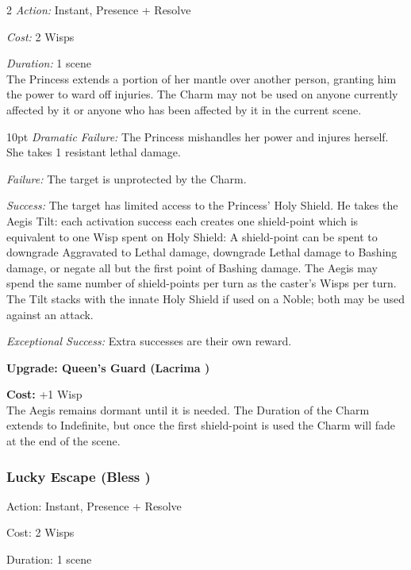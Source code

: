 \begin{multicols}{2}
\emph{Action:} Instant, Presence + Resolve

\emph{Cost:} 2 Wisps

\emph{Duration:} 1 scene \\

\noindent The Princess extends a portion of her mantle over another person, granting him the power to ward off injuries. The Charm may not be used on anyone currently affected by it or anyone who has been affected by it in the current scene. 

\begin{myindentpar}{10pt}    \emph{Dramatic Failure:} The Princess mishandles her power and injures herself. She takes 1 resistant lethal damage.

\emph{Failure:} The target is unprotected by the Charm. 

\emph{Success:} The target has limited access to the Princess’ Holy Shield. He takes the Aegis Tilt: each activation success each creates one shield-point which is equivalent to one Wisp spent on Holy Shield: A shield-point can be spent to downgrade Aggravated to Lethal damage, downgrade Lethal damage to Bashing damage, or negate all but the first point of Bashing damage. The Aegis may spend the same number of shield-points per turn as the caster's Wisps per turn. The Tilt stacks with the innate Holy Shield if used on a Noble; both may be used against an attack. 

\emph{Exceptional Success:} Extra successes are their own reward.

\textbf{Upgrade: Queen's Guard (Lacrima \textbullet\textbullet\textbullet)}

\noindent \textbf{Cost:} +1 Wisp\\

The Aegis remains dormant until it is needed. The Duration of the Charm extends to Indefinite, but once the first shield-point is used the Charm will fade at the end of the scene. 

 \end{myindentpar}

\subsubsection*{Lucky Escape (Bless \textbullet\textbullet\textbullet)}

Action: Instant, Presence + Resolve

Cost: 2 Wisps

Duration: 1 scene \\


\end{multicols}
